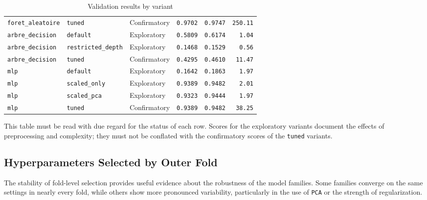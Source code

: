 \begin{table}[H]
\begin{tabular}{|l|l|l|r|r|r|}
\texttt{foret\_aleatoire} & \texttt{tuned} & Confirmatory & \texttt{0.9702} & \texttt{0.9747} & \texttt{250.11} \\
\texttt{arbre\_decision} & \texttt{default} & Exploratory & \texttt{0.5809} & \texttt{0.6174} & \texttt{1.04} \\
\texttt{arbre\_decision} & \texttt{restricted\_depth} & Exploratory & \texttt{0.1468} & \texttt{0.1529} & \texttt{0.56} \\
\texttt{arbre\_decision} & \texttt{tuned} & Confirmatory & \texttt{0.4295} & \texttt{0.4610} & \texttt{11.47} \\
\texttt{mlp} & \texttt{default} & Exploratory & \texttt{0.1642} & \texttt{0.1863} & \texttt{1.97} \\
\texttt{mlp} & \texttt{scaled\_only} & Exploratory & \texttt{0.9389} & \texttt{0.9482} & \texttt{2.01} \\
\texttt{mlp} & \texttt{scaled\_pca} & Exploratory & \texttt{0.9323} & \texttt{0.9444} & \texttt{1.97} \\
\texttt{mlp} & \texttt{tuned} & Confirmatory & \texttt{0.9389} & \texttt{0.9482} & \texttt{38.25} \\
\hline
\end{tabular}
\caption{Validation results by variant}
\end{table}

This table must be read with due regard for the status of each row. Scores for the exploratory variants document the effects of preprocessing and complexity; they must not be conflated with the confirmatory scores of the \texttt{tuned} variants.

\subsection{Hyperparameters Selected by Outer Fold}
The stability of fold-level selection provides useful evidence about the robustness of the model families. Some families converge on the same settings in nearly every fold, while others show more pronounced variability, particularly in the use of \texttt{PCA} or the strength of regularization.

